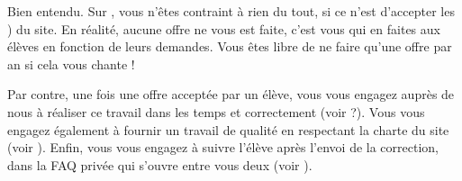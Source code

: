 ﻿Bien entendu. Sur \eDevoir, vous n'êtes contraint à rien du tout, si ce n'est d'accepter les ) du site. En réalité, aucune offre ne vous est faite, c'est vous qui en faites aux élèves en fonction de leurs demandes. Vous êtes libre de ne faire qu'une offre par an si cela vous chante !

Par contre, une fois une offre acceptée par un élève, vous vous engagez auprès de nous à réaliser ce travail dans les temps et correctement (voir  ?). Vous vous engagez également à fournir un travail de qualité en respectant la charte du site (voir ). Enfin, vous vous engagez à suivre l'élève après l'envoi de la correction, dans la FAQ privée qui s'ouvre entre vous deux (voir ).